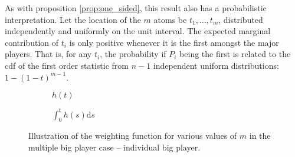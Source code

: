 \documentclass[a4paper]{article}
\newcommand{\ds}{\mathrm{d}s}
\begin{document}
As with proposition \ref{prop:one_sided}, this result also has a probabilistic interpretation.
Let the location of the $m$ atoms be $t_1, \dots, t_m$, distributed independently and uniformly on the unit interval.
The expected marginal contribution of $t_i$ is only positive whenever it is the first amongst the major players.
That is, for any $t_i$, the probability if $P_i$ being the first is related to the cdf of the first order statistic from $n-1$ independent uniform distributions: $1 - (1-t)^{m-1}$.

\begin{figure}[ht]
    \centering
    \begin{subfigure}[b]{0.45\textwidth}
        \centering
        \caption{$h(t)$}
    \end{subfigure}
    \begin{subfigure}[b]{0.45\textwidth}
        \centering
        \caption{$\int_0^t h(s) \ds$}
    \end{subfigure}
    \caption{Illustration of the weighting function for various values of $m$ in the multiple big player case -- individual big player.}
    \label{fig:multiple_platforms}
\end{figure}
\end{document}
